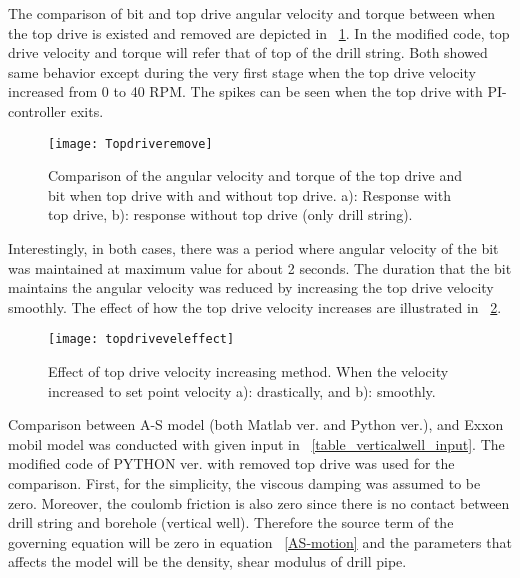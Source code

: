The comparison of bit and top drive angular velocity and torque between when the top drive is existed and removed are depicted in \figurename~\ref{figure_topdriveremove}. In the modified code, top drive velocity and torque will refer that of top of the drill string. Both showed same behavior except during the very first stage when the top drive velocity increased from 0 to 40 RPM. The spikes can be seen when the top drive with PI-controller exits. 

\begin{figure}[!hbt]
  \centering
  \texttt{[image: Topdriveremove]}
  \caption[comparison between with and without top drive]{Comparison of the angular velocity and torque of the top drive and bit when top drive with and without top drive. a): Response with top drive, b): response without top drive (only drill string).}\label{figure_topdriveremove}
\end{figure}

Interestingly, in both cases, there was a period where angular velocity of the bit was maintained at maximum value for about 2 seconds. The duration that the bit maintains the angular velocity was reduced by increasing the top drive velocity smoothly. The effect of how the top drive velocity increases are illustrated in \figurename~\ref{figure_topdriveveleffect}.

\begin{figure}[!hbt]
  \centering
  \texttt{[image: topdriveveleffect]}
  \caption{Effect of top drive velocity increasing method. When the velocity increased to set point velocity a): drastically, and b): smoothly.}\label{figure_topdriveveleffect}
\end{figure}

Comparison between A-S model (both Matlab ver. and Python ver.), and Exxon mobil model was conducted with given input in \tablename~\ref{table_verticalwell_input}. The modified code of PYTHON ver. with removed top drive was used for the comparison. First, for the simplicity, the viscous damping was assumed to be zero. Moreover, the coulomb friction is also zero since there is no contact between drill string and borehole (vertical well). Therefore the source term of the governing equation will be zero in equation \equationname~\ref{AS-motion} and the parameters that affects the model will be the density, shear modulus of drill pipe.

